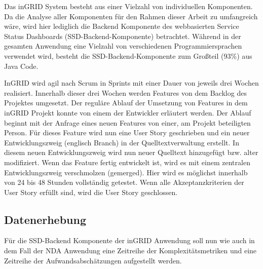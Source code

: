 Das inGRID System besteht aus einer Vielzahl von individuellen
Komponenten. Da die Analyse aller Komponenten für den Rahmen dieser
Arbeit zu umfangreich wäre, wird hier lediglich die Backend Komponente
des webbasierten Service Status Dashboards (SSD-Backend-Komponente)
betrachtet. Während in der gesamten Anwendung eine Vielzahl von
verschiedenen Programmiersprachen verwendet wird, besteht die
SSD-Backend-Komponente zum Gro\ss teil (93\%) aus
Java Code.

InGRID wird agil nach Scrum in Sprints mit einer Dauer von jeweils drei
Wochen realisiert. Innerhalb dieser drei Wochen werden Features von dem
Backlog des Projektes umgesetzt. Der reguläre Ablauf der Umsetzung von
Features in dem inGRID Projekt konnte von einem der Entwickler erläutert
werden. Der Ablauf beginnt mit der Anfrage eines neuen Features von
einer, am Projekt beteiligten Person. Für dieses Feature wird nun eine
User Story geschrieben und ein neuer Entwicklungszweig (englisch Branch)
in der Quelltextverwaltung erstellt. In diesem neuen Entwicklungszweig
wird nun neuer Quelltext hinzugefügt bzw. alter modifiziert. Wenn das
Feature fertig entwickelt ist, wird es mit einem zentralen
Entwicklungszweig verschmolzen (gemerged). Hier wird es möglichst
innerhalb von 24 bis 48 Stunden vollständig getestet. Wenn alle
Akzeptanzkriterien der User Story erfüllt sind, wird die User Story
geschlossen.

\subsection{Datenerhebung}\label{ingrid-Datenerhebung}

Für die SSD-Backend Komponente der inGRID Anwendung soll nun wie auch in
dem Fall der \ac{NDA} Anwendung eine Zeitreihe der Komplexitätsmetriken und
eine Zeitreihe der Aufwandsabschätzungen aufgestellt werden.

